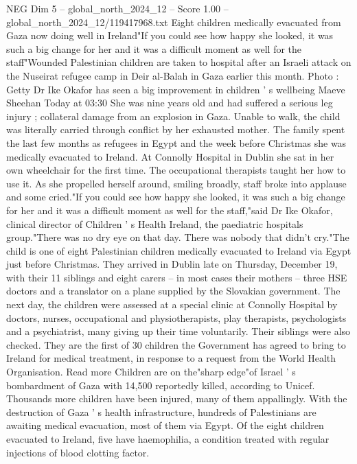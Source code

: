 \begin{textsample}{NEG Dim 5 – global\_north\_2024\_12 – Score 1.00 – global\_north\_2024\_12/119417968.txt}  \label{ex:f5_neg_354}
Eight children medically evacuated from Gaza now doing well in Ireland"If you could see how happy she looked, it was such a big change for her and it was a difficult moment as well for the staff"Wounded Palestinian children are taken to hospital after an Israeli attack on the Nuseirat refugee camp in Deir al-Balah in Gaza earlier this month.
Photo : Getty Dr Ike Okafor has seen a big improvement in children ' s wellbeing Maeve Sheehan Today at 03:30 She was nine years old and had suffered a serious leg injury ; collateral damage from an explosion in Gaza.
Unable to walk, the child was literally carried through conflict by her exhausted mother.
The family spent the last few months as refugees in Egypt and the week before Christmas she was medically evacuated to Ireland.
At Connolly Hospital in Dublin she sat in her own wheelchair for the first time.
The occupational therapists taught her how to use it.
As she propelled herself around, smiling broadly, staff broke into applause and some cried."If you could see how happy she looked, it was such a big change for her and it was a difficult moment as well for the staff,"said Dr Ike Okafor, clinical director of Children ' s Health Ireland, the paediatric hospitals group."There was no dry eye on that day.
There was nobody that didn't cry."The child is one of eight Palestinian children medically evacuated to Ireland via Egypt just before Christmas.
They arrived in Dublin late on Thursday, December 19, with their 11 siblings and eight carers -- in most cases their mothers -- three HSE doctors and a translator on a plane supplied by the Slovakian government.
The next day, the children were assessed at a special clinic at Connolly Hospital by doctors, nurses, occupational and physiotherapists, play therapists, psychologists and a psychiatrist, many giving up their time voluntarily.
Their siblings were also checked.
They are the first of 30 children the Government has agreed to bring to Ireland for medical treatment, in response to a request from the World Health Organisation.
Read more Children are on the"sharp edge"of Israel ' s bombardment of Gaza with 14,500 reportedly killed, according to Unicef.
Thousands more children have been injured, many of them appallingly.
With the destruction of Gaza ' s health infrastructure, hundreds of Palestinians are awaiting medical evacuation, most of them via Egypt.
Of the eight children evacuated to Ireland, five have haemophilia, a condition treated with regular injections of blood clotting factor.

\end{textsample}
